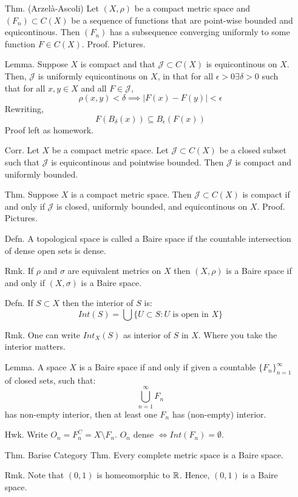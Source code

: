 \documentclass[12pt]{article}
\begin{document}
\begin{itemize}
    \item[Thm.] (Arzelà-Ascoli) Let $(X, \rho)$ be a compact metric space and $(F_n) \subset C(X)$ be a sequence of functions that are point-wise bounded and equicontinous. Then $(F_n)$ has a subsequence converging uniformly to some function $F \in C(X)$.
    Proof. Pictures.
    \item[Lemma.] Suppose $X$ is compact and that $\mathcal{J} \subset C(X)$ is equicontinous on $X$. Then, $\mathcal{J}$ is uniformly equicontinous on $X$, in that for all $\epsilon > 0 \exists \delta > 0$ such that for all $x, y \in X$ and all $F  \in \mathcal{J}$, 
        \[ \rho(x,y) < \delta \implies |F(x) - F(y)| < \epsilon \]
    Rewriting, 
    \[ F(B_\delta(x)) \subseteq B_\epsilon(F(x))\]
    Proof left as homework.  
    \item[Corr.] Let $X$ be a compact metric space. Let $\mathcal{J} \subset C(X)$ be a closed subset such that $\mathcal{J}$ is equicontinous and pointwise bounded. Then $\mathcal{J}$ is compact and uniformly bounded.
    \item[Thm.] Suppose $X$ is a compact metric space. Then $\mathcal{J} \subset C(X)$ is compact if and only if $\mathcal{J}$ is closed, uniformly bounded, and equicontinous on $X$.
    Proof. Pictures.   
    \item[Defn.] A topological space is called a Baire space if the countable intersection of dense open sets is dense. 
    \item[Rmk.] If $\rho$ and $\sigma$ are equivalent metrics on $X$ then $(X, \rho)$ is a Baire space if and only if $(X, \sigma)$ is a Baire space.
    \item[Defn.] If $S \subset X$ then the interior of $S$ is: 
    \[ Int(S) = \bigcup \{U \subset S : U \text{ is open in } X\} \]
    \item[Rmk.] One can write $Int_X(S)$ as interior of $S$ in $X$. Where you take the interior matters. 
    \item[Lemma.] A space $X$ is a Baire space if and only if given a countable $\{F_n\}_{n = 1}^\infty$ of closed sets, such that:
    \[ \bigcup_{n = 1}^\infty F_n\]    
    has non-empty interior, then at least one $F_n$ has (non-empty) interior. 
    \item[Hwk. ] Write $O_n = F_n^C = X \setminus F_n$. $O_n$ dense $\iff Int(F_n) = \emptyset$. 
    \item[Thm.] Barise Category Thm. Every complete metric space is a Baire space.
    \item[Rmk.] Note that $(0, 1)$ is homeomorphic to $\mathbb R$. Hence, $(0, 1)$ is a Baire space. 

\end{itemize}
\end{document}
